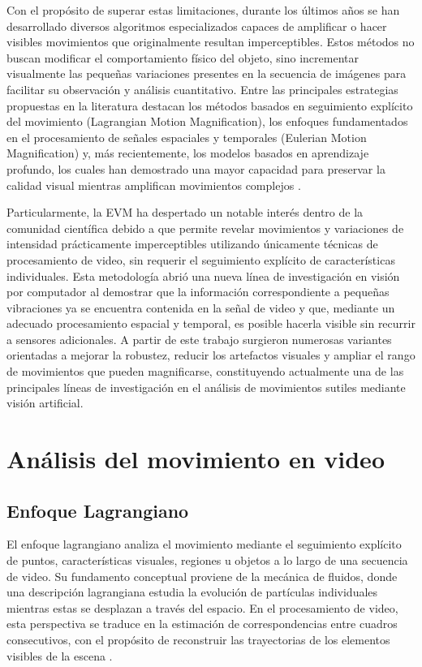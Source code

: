 Con el propósito de superar estas limitaciones, durante los últimos años se han desarrollado diversos algoritmos especializados capaces de amplificar o hacer visibles movimientos que originalmente resultan imperceptibles. Estos métodos no buscan modificar el comportamiento físico del objeto, sino incrementar visualmente las pequeñas variaciones presentes en la secuencia de imágenes para facilitar su observación y análisis cuantitativo. Entre las principales estrategias propuestas en la literatura destacan los métodos basados en seguimiento explícito del movimiento (Lagrangian Motion Magnification), los enfoques fundamentados en el procesamiento de señales espaciales y temporales (Eulerian Motion Magnification) y, más recientemente, los modelos basados en aprendizaje profundo, los cuales han demostrado una mayor capacidad para preservar la calidad visual mientras amplifican movimientos complejos \cite{wu2012eulerian,oh2018learning}.

Particularmente, la \gls{EVM} ha despertado un notable interés dentro de la comunidad científica debido a que permite revelar movimientos y variaciones de intensidad prácticamente imperceptibles utilizando únicamente técnicas de procesamiento de video, sin requerir el seguimiento explícito de características individuales. Esta metodología abrió una nueva línea de investigación en visión por computador al demostrar que la información correspondiente a pequeñas vibraciones ya se encuentra contenida en la señal de video y que, mediante un adecuado procesamiento espacial y temporal, es posible hacerla visible sin recurrir a sensores adicionales. A partir de este trabajo surgieron numerosas variantes orientadas a mejorar la robustez, reducir los artefactos visuales y ampliar el rango de movimientos que pueden magnificarse, constituyendo actualmente una de las principales líneas de investigación en el análisis de movimientos sutiles mediante visión artificial.
\section{Análisis del movimiento en video}
\label{subsec:analisis_movimiento_video}

	\subsection{Enfoque Lagrangiano}
	\label{subsubsec:enfoque_lagrangiano}

El enfoque lagrangiano analiza el movimiento mediante el seguimiento explícito de puntos, características visuales, regiones u objetos a lo largo de una secuencia de video. Su fundamento conceptual proviene de la mecánica de fluidos, donde una descripción lagrangiana estudia la evolución de partículas individuales mientras estas se desplazan a través del espacio. En el procesamiento de video, esta perspectiva se traduce en la estimación de correspondencias entre cuadros consecutivos, con el propósito de reconstruir las trayectorias de los elementos visibles de la escena \cite{ahmed2023overview,liu2005motion}.

